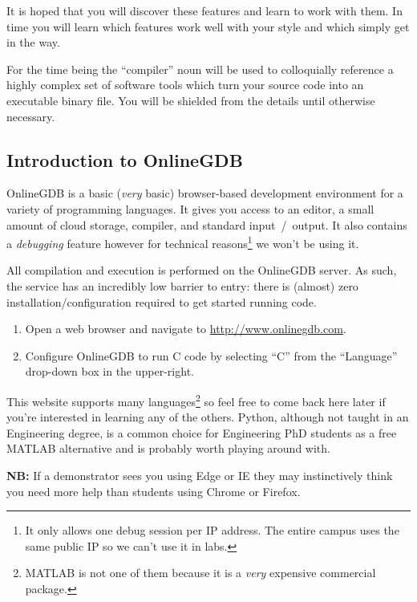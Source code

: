 \documentclass{lab}
\begin{document}
It is hoped that you will discover these features and learn to work with them. In time you will learn which features work well with your style and which simply get in the way.

For the time being the ``compiler'' noun will be used to colloquially reference a highly complex set of software tools which turn your source code into an executable binary file. You will be shielded from the details until otherwise necessary.

\subsection{Introduction to OnlineGDB}

OnlineGDB is a basic (\textit{very} basic) browser-based development environment for a variety of programming languages. It gives you access to an editor, a small amount of cloud storage, compiler, and standard input~/~output. It also contains a \textit{debugging} feature however for technical reasons\footnote{It only allows one debug session per IP address. The entire campus uses the same public IP so we can't use it in labs.} we won't be using it.

All compilation and execution is performed on the OnlineGDB server. As such, the service has an incredibly low barrier to entry: there is (almost) zero installation/configuration required to get started running code.

\begin{task}{}{}
\begin{enumerate}

\item Open a web browser and navigate to \url{http://www.onlinegdb.com}.

\item Configure OnlineGDB to run C code by selecting ``C'' from the ``Language'' drop-down box in the upper-right.
\end{enumerate}

This website supports many languages\footnote{MATLAB is not one of them because it is a \textit{very} expensive commercial package.} so feel free to come back here later if you're interested in learning any of the others. Python, although not taught in an Engineering degree, is a common choice for Engineering PhD students as a free MATLAB alternative and is probably worth playing around with.

\textbf{NB:} If a demonstrator sees you using Edge or IE they may instinctively think you need more help than students using Chrome or Firefox.
\end{task}
\end{document}
